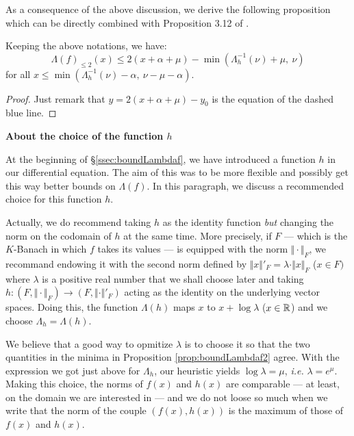 \documentclass{sig-alternate}
\begin{document}
As a consequence of the above discussion, we derive the following 
proposition which can be directly combined with Proposition 3.12 of 
\cite{padicprec}.

\begin{prop}
\label{prop:boundLambdaf2}
Keeping the above notations, we have:
$$\Lambda(f)_{\leq 2} (x) \leq 2(x + \alpha + \mu) -
\min(\Lambda_h^{-1}(\nu) + \mu, \: \nu)$$
for all $x \leq \min(\Lambda_h^{-1}(\nu) - \alpha, \: \nu - \mu - \alpha)$.
\end{prop}

\begin{proof}
Just remark that $y = 2(x + \alpha + \mu) - y_0$ is the equation of 
the dashed blue line.
\end{proof}

\noindent
\textbf{About the choice of the function $h$}

\smallskip

At the beginning of \S \ref{ssec:boundLambdaf}, we have introduced a 
function $h$ in our differential equation. The aim of this was to be 
more flexible and possibly get this way better bounds on $\Lambda(f)$. 
In this paragraph, we discuss a recommended choice for this function 
$h$.

Actually, we do recommend taking $h$ as the identity function 
\emph{but} changing the norm on the codomain of $h$ at the same time.
More precisely, if $F$ --- which is the $K$-Banach in which $f$ takes
its values --- is equipped with the norm $\Vert \cdot \Vert_F$, we 
recommand endowing it with the second norm defined by
$\Vert x \Vert'_F = \lambda \cdot \Vert x \Vert_F$ ($x \in F)$
where $\lambda$ is a positive real number that we shall choose later 
and taking $h : (F, \Vert \cdot \Vert_F) \to (F, \Vert \cdot \Vert'_F)$ 
acting as the identity on the underlying vector spaces. Doing this, the 
function $\Lambda(h)$ maps $x$ to $x + \log \lambda$ ($x \in \mathbb R$) and we 
choose $\Lambda_h = \Lambda(h)$.

We believe that a good way to opmitize $\lambda$ is to choose it so that 
the two quantities in the minima in Proposition \ref{prop:boundLambdaf2} 
agree. With the expression we got just above for $\Lambda_h$, our 
heuristic yields $\log \lambda = \mu$, \emph{i.e.} $\lambda = e^\mu$.
Making this choice, the norms of $f(x)$ and $h(x)$ are comparable --- 
at least, on the domain we are interested in --- and we do not loose so 
much when we write that the norm of the couple $(f(x), h(x))$ is the 
maximum of those of $f(x)$ and $h(x)$.
\end{document}

